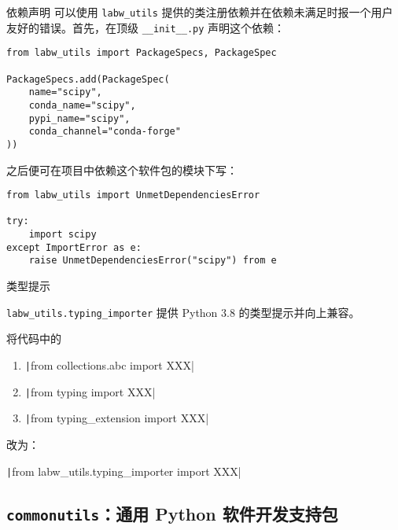 \documentclass[pdf,9pt]{beamer}
\newcommand{\lu}{\texttt{labw\_utils}}
\begin{document}
    \begin{frame}
        \subsectionpage
    \end{frame}

    \begin{frame}[fragile]{依赖声明}
        可以使用 \lu{} 提供的类注册依赖并在依赖未满足时报一个用户友好的错误。首先，在顶级 \Verb|__init__.py| 声明这个依赖：

        \begin{verbatim}
from labw_utils import PackageSpecs, PackageSpec

PackageSpecs.add(PackageSpec(
    name="scipy",
    conda_name="scipy",
    pypi_name="scipy",
    conda_channel="conda-forge"
))
        \end{verbatim}

        之后便可在项目中依赖这个软件包的模块下写：

        \begin{verbatim}
from labw_utils import UnmetDependenciesError

try:
    import scipy
except ImportError as e:
    raise UnmetDependenciesError("scipy") from e
        \end{verbatim}
    \end{frame}
    \begin{frame}[fragile]{类型提示}

        \Verb|labw_utils.typing_importer| 提供 Python 3.8 的类型提示并向上兼容。

        将代码中的

        \begin{enumerate}
            \item \texttt|from collections.abc import XXX|
            \item \texttt|from typing import XXX|
            \item \texttt|from typing_extension import XXX|
        \end{enumerate}

        改为：

        \texttt|from labw_utils.typing_importer import XXX|

    \end{frame}

    \subsection{\texttt{commonutils}：通用 Python 软件开发支持包}
\end{document}
